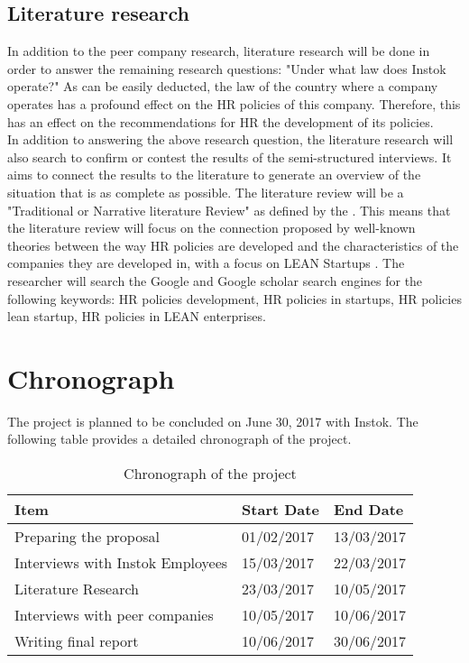 \documentclass[man]{apa6}
\begin{document}
\subsection{Literature research}
In addition to the peer company research, literature research will be done in order to answer the remaining research questions: "Under what law does Instok operate?" As can be easily deducted, the law of the country where a company operates has a profound effect on the HR policies of this company. Therefore, this has an effect on the recommendations for HR the development of its policies.\\
In addition to answering the above research question, the literature research will also search to confirm or contest the results of the semi-structured interviews. It aims to connect the results to the literature to generate an overview of the situation that is as complete as possible.	The literature review will be a "Traditional or Narrative literature Review" as defined by the \cite{TOLEDO2016}. This means that the literature review will focus on the connection proposed by well-known theories between the way HR policies are developed and the characteristics of the companies they are developed in, with a focus on LEAN Startups \parencite{RIES2011}. The researcher will search the Google and Google scholar search engines for the following keywords: HR policies development, HR policies in startups, HR policies lean startup, HR policies in LEAN enterprises.

\section{Chronograph}
The project is planned to be concluded on June 30, 2017 with Instok. The following table provides a detailed chronograph of the project.

\begin{table}[]
\centering
\caption{Chronograph of the project}
\label{chronograph}
\begin{tabular}{|l|l|l|}
\hline
Item                             & Start Date & End Date   \\ \hline
Preparing the proposal			 & 01/02/2017 & 13/03/2017 \\ \hline
Interviews with Instok Employees & 15/03/2017 & 22/03/2017 \\ \hline
Literature Research              & 23/03/2017 & 10/05/2017 \\ \hline
Interviews with  peer companies  & 10/05/2017 & 10/06/2017 \\ \hline
Writing final report             & 10/06/2017 & 30/06/2017 \\ \hline
\end{tabular}
\end{table}

\printbibliography

\end{document}
